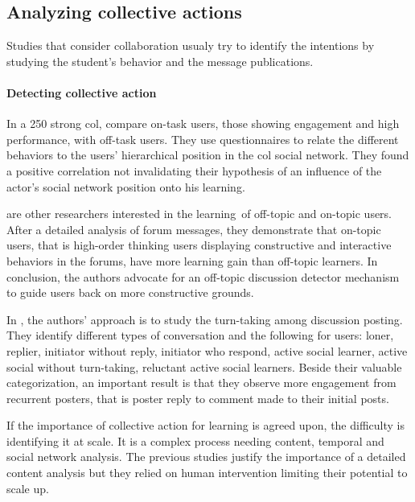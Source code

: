 \documentclass[a4paper,twoside]{article}
\begin{document}
\subsection{Analyzing collective actions}
Studies that consider collaboration usualy try to identify the intentions by studying the student's behavior and the message publications.


\paragraph{Detecting collective action}  In a 250 strong \gls{col}, \cite{Rehm2015} compare on-task users, those showing engagement and high performance, with off-task users.  They use questionnaires to relate the different behaviors to the users' hierarchical position in the \gls{col} social network.  They found a positive correlation not invalidating their hypothesis of an influence of the actor's social network position onto his learning. %

\cite{Wang2016} are other researchers interested in the learning~of off-topic and on-topic users.  After a detailed analysis of forum messages, they demonstrate that on-topic users, that is high-order thinking users displaying constructive and interactive behaviors in the forums, have more learning gain than off-topic learners.  In conclusion, the authors advocate for an off-topic discussion detector mechanism to guide users back on more constructive grounds.

In \citep{Chua2017}, the authors' approach is to study the turn-taking among discussion posting.  They identify different types of conversation and the following for users: loner, replier, initiator without reply, initiator who respond, active social learner, active social without turn-taking, reluctant active social learners.  Beside their valuable categorization, an important result is that they observe more engagement from recurrent posters, that is poster reply to comment made to their initial posts.

If the importance of collective action for learning is agreed upon, the difficulty is identifying it at scale.  It is a complex process needing content, temporal and social network analysis.  The previous studies justify the importance of a detailed content analysis but they relied on human intervention limiting their potential to scale up.
\end{document}
